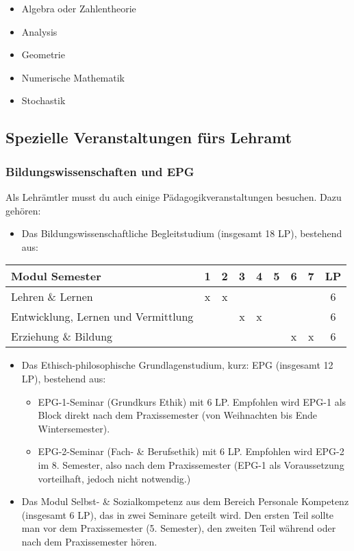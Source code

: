 \begin{itemize}
\item Algebra oder Zahlentheorie
\item Analysis
\item Geometrie
\item Numerische Mathematik
\item Stochastik
\end{itemize}


\subsection{Spezielle Veranstaltungen fürs Lehramt}

\subsubsection{Bildungswissenschaften und EPG}

Als Lehrämtler musst du auch
einige Pädagogikveranstaltungen besuchen.
Dazu gehören:
\begin{itemize}
\item Das Bildungswissenschaftliche Begleitstudium (insgesamt 18 LP), bestehend aus:
\end{itemize}
\begin{center}
\begin{tabular}{|p{17em}|c|c|c|c|c|c|c|c|} \hline
Modul \hfill Semester & 1 & 2 & 3 & 4 & 5 & 6 & 7 & LP \\  \hline
Lehren \& Lernen & x & x & &&&&& 6 \\  \hline
Entwicklung, Lernen und Vermittlung &&&x & x &&&& 6 \\ \hline 
Erziehung \& Bildung &&&&&& x & x & 6 \\ \hline
\end{tabular}
\end{center}

\begin{itemize}
\item Das Ethisch-philosophische Grundlagenstudium, kurz: EPG (insgesamt 12 LP), bestehend aus:
\begin{itemize}
\item EPG-1-Seminar (Grundkurs Ethik) mit 6 LP. Empfohlen wird EPG-1 als Block direkt nach dem Praxissemester (von Weihnachten bis Ende Wintersemester).
\item EPG-2-Seminar (Fach- \& Berufsethik) mit 6 LP. Empfohlen wird EPG-2 im 8. Semester, also nach dem Praxissemester (EPG-1 als Voraussetzung vorteilhaft, jedoch nicht notwendig.)
\end{itemize}


\item Das Modul Selbst- \& Sozialkompetenz aus dem Bereich Personale Kompetenz (insgesamt 6 LP), das in zwei Seminare geteilt wird. Den ersten Teil sollte man vor dem Praxissemester (5. Semester), den zweiten Teil während oder nach dem Praxissemester hören.
\end{itemize}

